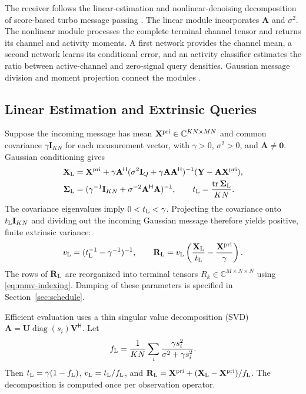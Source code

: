 \documentclass[10pt,a4paper]{article}
\newcommand{\I}{\mathbf{I}}
\newcommand{\tr}{\operatorname{tr}}
\newcommand{\diag}{\operatorname{diag}}
\begin{document}
The receiver follows the linear-estimation and nonlinear-denoising
decomposition of score-based turbo message passing
\cite[Secs.~III--V]{cai2026}. The linear module incorporates
$\mathbf{A}$ and $\sigma^2$. The nonlinear module processes the complete
terminal channel tensor and returns its channel and activity moments.
A first network provides the channel mean, a second network learns its
conditional error, and an activity classifier estimates the ratio between
active-channel and zero-signal query densities. Gaussian message division
and moment projection connect the modules
\cite[Secs.~II--III]{minka2001}.

\subsection{Linear Estimation and Extrinsic Queries}

Suppose the incoming message has mean
$\mathbf{X}^{\rm pri}\in\mathbb{C}^{KN\times MN}$ and common covariance
$\gamma\I_{KN}$ for each measurement vector, with $\gamma>0$,
$\sigma^2>0$, and $\mathbf A\ne\mathbf0$. Gaussian conditioning gives
\begin{align}
 \mathbf{X}_{\rm L}
 &=\mathbf{X}^{\rm pri}+\gamma\mathbf{A}^{\mathsf H}
   (\sigma^2\I_Q+\gamma\mathbf{A}\mathbf{A}^{\mathsf H})^{-1}
   (\mathbf{Y}-\mathbf{A}\mathbf{X}^{\rm pri}),
 \label{eq:linear-mean}\\
 \bm\Sigma_{\rm L}
 &=(\gamma^{-1}\I_{KN}+\sigma^{-2}\mathbf{A}^{\mathsf H}\mathbf{A})^{-1},
 \qquad t_{\rm L}=\frac{\tr\bm\Sigma_{\rm L}}{KN}.
 \label{eq:linear-variance}
\end{align}
The covariance eigenvalues imply $0<t_{\rm L}<\gamma$. Projecting the
covariance onto $t_{\rm L}\I_{KN}$ and dividing out the incoming
Gaussian message therefore yields positive, finite extrinsic variance:
\begin{equation}
 v_{\rm L}=(t_{\rm L}^{-1}-\gamma^{-1})^{-1},\qquad
 \mathbf{R}_{\rm L}=v_{\rm L}
     \left(\frac{\mathbf{X}_{\rm L}}{t_{\rm L}}
                         -\frac{\mathbf{X}^{\rm pri}}{\gamma}\right).
 \label{eq:linear-extrinsic}
\end{equation}
The rows of $\mathbf{R}_{\rm L}$ are reorganized into terminal tensors
$R_k\in\mathbb{C}^{M\times N\times N}$ using
\eqref{eq:mmv-indexing}. Damping of these parameters is specified in
Section~\ref{sec:schedule}.

Efficient evaluation uses a thin singular value decomposition (SVD)
$\mathbf{A}=\mathbf{U}\diag(s_i)\mathbf{V}^{\mathsf H}$. Let
\begin{equation}
 f_{\rm L}=\frac{1}{KN}\sum_i
       \frac{\gamma s_i^2}{\sigma^2+\gamma s_i^2}.
 \label{eq:linear-fraction}
\end{equation}
Then $t_{\rm L}=\gamma(1-f_{\rm L})$,
$v_{\rm L}=t_{\rm L}/f_{\rm L}$, and
$\mathbf{R}_{\rm L}=\mathbf{X}^{\rm pri}
+(\mathbf{X}_{\rm L}-\mathbf{X}^{\rm pri})/f_{\rm L}$.
The decomposition is computed once per observation operator.
\end{document}
